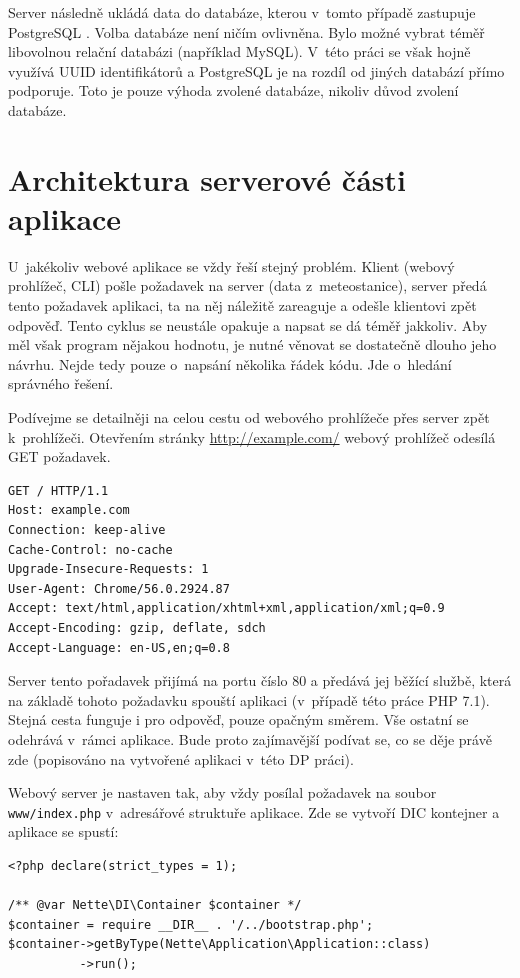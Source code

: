 Server následně ukládá data do databáze, kterou v~tomto případě zastupuje PostgreSQL \cite{postgresql}. Volba databáze není ničím ovlivněna. Bylo možné vybrat téměř libovolnou relační databázi (například MySQL). V~této práci se však hojně využívá UUID identifikátorů a PostgreSQL je na rozdíl od jiných databází přímo podporuje. Toto je pouze výhoda zvolené databáze, nikoliv důvod zvolení databáze.


\section{Architektura serverové části aplikace}
U~jakékoliv webové aplikace se vždy řeší stejný problém. Klient (webový prohlížeč, CLI) pošle požadavek na server (data z~meteostanice), server předá tento požadavek aplikaci, ta na něj náležitě zareaguje a odešle klientovi zpět odpověď. Tento cyklus se neustále opakuje a napsat se dá téměř jakkoliv. Aby měl však program nějakou hodnotu, je nutné věnovat se dostatečně dlouho jeho návrhu. Nejde tedy pouze o~napsání několika řádek kódu. Jde o~hledání správného řešení.

Podívejme se detailněji na celou cestu od webového prohlížeče přes server zpět k~prohlížeči. Otevřením stránky \url{http://example.com/} webový pro\-hlí\-žeč odesílá GET požadavek.

\begin{verbatim}
GET / HTTP/1.1
Host: example.com
Connection: keep-alive
Cache-Control: no-cache
Upgrade-Insecure-Requests: 1
User-Agent: Chrome/56.0.2924.87
Accept: text/html,application/xhtml+xml,application/xml;q=0.9
Accept-Encoding: gzip, deflate, sdch
Accept-Language: en-US,en;q=0.8
\end{verbatim}

Server tento pořadavek přijímá na portu číslo 80 a předává jej běžící službě, která na základě tohoto požadavku spouští aplikaci (v~případě této práce PHP 7.1). Stejná cesta funguje i pro odpověď, pouze opačným směrem. Vše ostatní se odehrává v~rámci aplikace. Bude proto zajímavější podívat se, co se děje právě zde (popisováno na vytvořené aplikaci v~této DP práci).

Webový server je nastaven tak, aby vždy posílal požadavek na soubor \texttt{www/index.php} v~adresářové struktuře aplikace. Zde se vytvoří DIC kontejner a aplikace se spustí:

\begin{verbatim}
<?php declare(strict_types = 1);

/** @var Nette\DI\Container $container */
$container = require __DIR__ . '/../bootstrap.php';
$container->getByType(Nette\Application\Application::class)
          ->run();
\end{verbatim}

